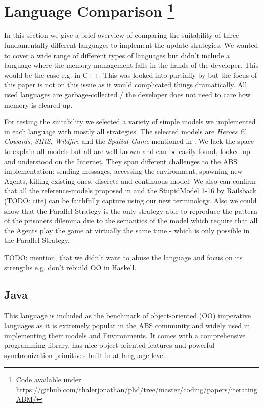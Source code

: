 \section[Language Comparison]{Language Comparison \footnote{Code available under\\ \url{https://github.com/thalerjonathan/phd/tree/master/coding/papers/iteratingABM/}}}
In this section we give a brief overview of comparing the suitability of three fundamentally different languages to implement the update-strategies. We wanted to cover a wide range of different types of languages but didn't include a language where the memory-management falls in the hands of the developer. This would be the case e.g. in C++. This was looked into partially by \cite{dawson_opening_2014} but the focus of this paper is not on this issue as it would complicated things dramatically. All used languages are garbage-collected / the developer does not need to care how memory is cleared up.

For testing the suitability we selected a variety of simple models we implemented in each language with mostly all strategies. The selected models are \textit{Heroes \& Cowards}, \textit{SIRS}, \textit{Wildfire} and the \textit{Spatial Game} mentioned in \cite{huberman_evolutionary_1993}. We lack the space to explain all models but all are well known and can be easily found, looked up and understood on the Internet. They span different challenges to the ABS implementation: sending messages, accessing the environment, spawning new Agents, killing existing ones, discrete and continuous model. We also can confirm that all the reference-models proposed in \cite{isaac_abm_2011} and the StupidModel 1-16 by Railsback (TODO: cite) can be faithfully capture using our new terminology. Also we could show that the  Parallel Strategy is the only strategy able to reproduce the pattern of the prisoners dilemma due to the semantics of the model which require that all the Agents play the game at virtually the same time - which is only possible in the Parallel Strategy.

TODO: mention, that we didn't want to abuse the language and focus on its strengths e.g. don't rebuild OO in Haskell.


\subsection{Java}
This language is included as the benchmark of object-oriented (OO) imperative languages as it is extremely popular in the ABS community and widely used in implementing their models and Environments. It comes with a comprehensive programming library, has nice object-oriented features and powerful synchronization primitives built in at language-level.

